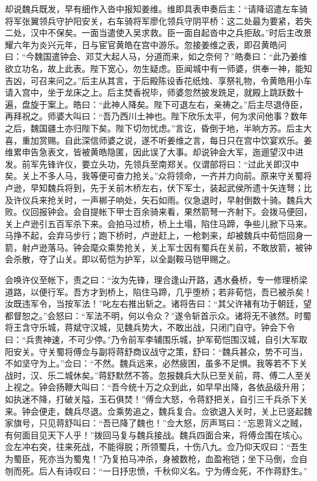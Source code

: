却说魏兵既发，早有细作入沓中报知姜维。维即具表申奏后主：“请降诏遣左车骑将军张翼领兵守护阳安关，右车骑将军廖化领兵守阴平桥：这二处最为要紧，若失二处，汉中不保矣。一面当遣使入吴求救。臣一面自起沓中之兵拒敌。”时后主改景耀六年为炎兴元年，日与宦官黄皓在宫中游乐。忽接姜维之表，即召黄皓问曰：“今魏国遣钟会、邓艾大起人马，分道而来，如之奈何？”皓奏曰：“此乃姜维欲立功名，故上此表。陛下宽心，勿生疑虑。臣闻城中有一师婆，供奉一神，能知吉凶，可召来问之。”后主从其言，于后殿陈设香花纸烛、享祭礼物，令黄皓用小车请入宫中，坐于龙床之上。后主焚香祝毕，师婆忽然披发跣足，就殿上跳跃数十遍，盘旋于案上。皓曰：“此神人降矣。陛下可退左右，亲祷之。”后主尽退侍臣，再拜祝之。师婆大叫曰：“吾乃西川土神也。陛下欣乐太平，何为求问他事？数年之后，魏国疆土亦归陛下矣。陛下切勿忧虑。”言讫，昏倒于地，半晌方苏。后主大喜，重加赏赐。自此深信师婆之说，遂不听姜维之言，每日只在宫中饮宴欢乐。姜维累申告急表文，皆被黄皓隐匿，因此误了大事。却说钟会大军，迤逦望汉中进发。前军先锋许仪，要立头功，先领兵至南郑关。仪谓部将曰：“过此关即汉中矣。关上不多人马，我等便可奋力抢关。”众将领命，一齐并力向前。原来守关蜀将卢逊，早知魏兵将到，先于关前木桥左右，伏下军士，装起武侯所遗十矢连弩；比及许仪兵来抢关时，一声梆子响处，矢石如雨。仪急退时，早射倒数十骑。魏兵大败。仪回报钟会。会自提帐下甲士百余骑来看，果然箭弩一齐射下。会拨马便回，关上卢逊引五百军杀下来。会拍马过桥，桥上土塌，陷住马蹄，争些儿掀下马来。马挣不起，会弃马步行；跑下桥时，卢逊赶上，一枪刺来，却被魏兵中荀恺回身一箭，射卢逊落马。钟会麾众乘势抢关，关上军士因有蜀兵在关前，不敢放箭，被钟会杀散，夺了山关。即以荀恺为护军，以全副鞍马铠甲赐之。

会唤许仪至帐下，责之曰：“汝为先锋，理合逢山开路，遇水叠桥，专一修理桥梁道路，以便行军。吾方才到桥上，陷住马蹄，几乎堕桥；若非荀恺，吾已被杀矣！汝既违军令，当按军法！”叱左右推出斩之。诸将告曰：“其父许褚有功于朝廷，望都督恕之。”会怒曰：“军法不明，何以令众？”遂令斩首示众。诸将无不骇然。时蜀将王含守乐城，蒋斌守汉城，见魏兵势大，不敢出战，只闭门自守。钟会下令曰：“兵贵神速，不可少停。”乃令前军李辅围乐城，护军荀恺围汉城，自引大军取阳安关。守关蜀将傅佥与副将蒋舒商议战守之策，舒曰：“魏兵甚众，势不可当，不如坚守为上。”佥曰：“不然。魏兵远来，必然疲困，虽多不足惧。我等若不下关战时，汉、乐二城休矣。”蒋舒默然不答。忽报魏兵大队已至关前，蒋、傅二人至关上视之。钟会扬鞭大叫曰：“吾今统十万之众到此，如早早出降，各依品级升用；如执迷不降，打破关隘，玉石俱焚！”傅佥大怒，令蒋舒把关，自引三千兵杀下关来。钟会便走，魏兵尽退。佥乘势追之，魏兵复合。佥欲退入关时，关上已竖起魏家旗号，只见蒋舒叫曰：“吾已降了魏也！”佥大怒，厉声骂曰：“忘恩背义之贼，有何面目见天下人乎！”拨回马复与魏兵接战。魏兵四面合来，将傅佥围在垓心。佥左冲右突，往来死战，不能得脱；所领蜀兵，十伤八九。佥乃仰天叹曰：“吾生为蜀臣，死亦当为蜀鬼！”乃复拍马冲杀，身被数枪，血盈袍铠；坐下马倒，佥自刎而死。后人有诗叹曰：“一日抒忠愤，千秋仰义名。宁为傅佥死，不作蒋舒生。”


